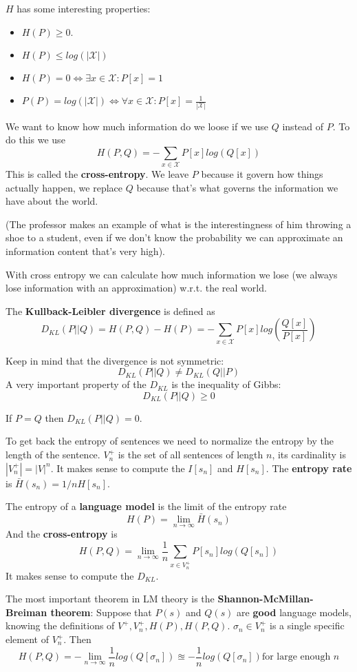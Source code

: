 $H$ has some interesting properties:
\begin{itemize}
    \item $H(P) \geq 0$.
    \item $H(P) \leq log(|\mathcal{X}|)$
    \item $H(P)=0 \iff \exists x\in\mathcal{X}:P[x]=1$
    \item $P(P)=log(|\mathcal{X}|) \iff \forall x\in\mathcal{X}:P[x]=\frac{1}{|\mathcal{X}|}$
\end{itemize}

We want to know how much information do we loose if we use
$Q$ instead of $P$.
To do this we use
\[
    H(P,Q)=-\sum_{x\in\mathcal{X}}P[x]log(Q[x])
\]
This is called the \textbf{cross-entropy}.
We leave $P$ because it govern how things actually happen,
we replace $Q$ because that's what governs the information
we have about the world.

(The professor makes an example of what is the interestingness of him
throwing a shoe to a student, even if we don't know the probability
we can approximate an information content that's very high).

With cross entropy we can calculate how much information
we lose (we always lose information with an approximation)
w.r.t. the real world.

The \textbf{Kullback-Leibler divergence} is defined as
\[
    D_{KL}(P||Q)=H(P,Q)-H(P)=-\sum_{x\in\mathcal{X}}P[x]log\left(\frac{Q[x]}{P[x]}\right)
\]

Keep in mind that the divergence is not symmetric:
\[
    D_{KL}(P||Q)\neq D_{KL}(Q||P)
\]
A very important property of the $D_{KL}$ is the
inequality of Gibbs:
\[
    D_{KL}(P||Q)\geq 0
\]

If $P=Q$ then $D_{KL}(P||Q)=0$.

To get back the entropy of sentences we need to normalize
the entropy by the length of the sentence.
$V^+_n$ is the set of all sentences of length $n$,
its cardinality is $|V^+_n|=|V|^n$.
It makes sense to compute the $I[s_n]$ and $H[s_n]$.
The \textbf{entropy rate} is $\bar{H}(s_n)=1/nH[s_n]$.

The entropy of a \textbf{language model} is the limit
of the entropy rate
\[
    H(P)=\lim_{n\rightarrow\infty}\bar{H}(s_n)
\]
And the \textbf{cross-entropy} is
\[
    H(P,Q)=\lim_{n\rightarrow\infty}\frac{1}{n}\sum_{x\in V^+_n}P[s_n]log(Q[s_n])
\]
It makes sense to compute the $D_{KL}$.

The most important theorem in LM theory is the
\textbf{Shannon-McMillan-Breiman theorem}:
Suppose that $P(s)$ and $Q(s)$ are \textbf{good} language models,
knowing the definitions of $V^+,V^+_n,H(P),H(P,Q)$.
$\sigma_n\in V^+_n$ is a single specific element of $V^+_n$.
Then
\[
    H(P,Q)=-\lim_{n\rightarrow\infty}\frac{1}{n}log(Q[\sigma_n])\approxeq
    -\frac{1}{n}log(Q[\sigma_n]) \text{for large enough } n
\]

